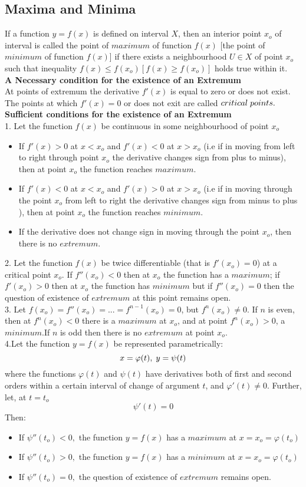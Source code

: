 \documentclass[12pt]{article}
\begin{document}
\subsection{Maxima and Minima}
If a function $y=f(x)$ is defined on interval $X$, then an interior point $x_o$ of interval is called the point of $maximum$ of function $f(x)$ [the point of $minimum$ of function $f(x)$] if there exists a neighbourhood $U \in X$ of point $x_o$ such that inequality $f(x) \le f(x_o)[f(x) \ge f(x_o)]$ holds true within it.\\
\textbf{A Necessary condition for the existence of an  Extremum}\\ At points of extremum the derivative $f'(x)$ is equal to zero or does not exist. The points at which $f'(x)=0$ or does not exit are called $critical \thickspace points.$\\
\textbf{Sufficient conditions for the existence of an Extremum} \\
1. Let the function $f(x)$ be continuous in some neighbourhood of point $x_o$
\begin{itemize}
\item If $f'(x)>0$ at $x<x_o$ and $f'(x)<0$ at $x>x_o$ (i.e if in moving from left to right through point $x_o$ the derivative changes
sign from plus to minus), then at point $x_o$ the function reaches $maximum.$
\item If $f'(x)<0$ at $x<x_o$ and $f'(x)>0$ at $x>x_o$ (i.e if in moving through the point $x_o$ from left to right the derivative changes sign from minus to plus ), then at point $x_o$ the function reaches $minimum.$
\item If the derivative does not change sign in moving through the point $x_o$, then there is no $extremum.$
\end{itemize}
2. Let the function $f(x)$ be twice differentiable (that is $f'(x_o)=0$) at a critical point $x_o$. If $f''(x_o)<0$ then at $x_o$ the function has a $maximum$; if $f'(x_o)>0$ then at $x_o$ the function has $minimum$ but if $f''(x_o)=0$ then the question of existence of $extremum$ at this point remains open. \\
3. Let $f(x_o)=f''(x_o)=...=f^{n-1}(x_o)=0$, but $f^n(x_o) \not= 0$. If $n$ is even, then at $f^n(x_o)<0$ there is a $maximum$ at $x_o$, and at point $f^n(x_o)>0$, a $minimum$.If $n$ is odd then there is no $extremum$ at point $x_o$. \\
4.Let the function $y=f(x)$ be represented parametrically:
$$x=\varphi(t), \thickspace y=\psi(t)$$ where the functions $\varphi(t)$ and $\psi(t)$ have derivatives both of first and second orders within a certain interval of change of argument $t$, and $\varphi'(t) \not=0$. Further, let, at $t=t_o$
$$\psi'(t)=0$$
Then:
\begin{itemize}
\item If $\psi''(t_o)<0,$ the function $y=f(x)$ has a $maximum$ at $x=x_o=\varphi(t_o)$
\item If $\psi''(t_o)>0,$ the function $y=f(x)$ has a $minimum$ at $x=x_o=\varphi(t_o)$
\item If $\psi''(t_o)=0,$ the question of existence of $extremum$ remains open.
\end{itemize}
\end{document}
